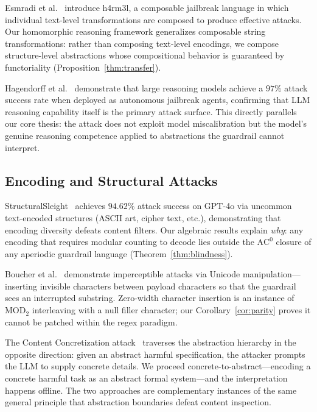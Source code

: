 \documentclass[letterpaper,twocolumn,10pt]{article}
\theoremstyle{definition}
\theoremstyle{remark}
\begin{document}
Esmradi et al.~\cite{esmradi2024h4rm3l} introduce h4rm3l, a composable jailbreak
language in which individual text-level transformations are composed to produce
effective attacks.
Our homomorphic reasoning framework generalizes composable string transformations:
rather than composing text-level encodings, we compose structure-level abstractions
whose compositional behavior is guaranteed by functoriality
(Proposition~\ref{thm:transfer}).

Hagendorff et al.~\cite{reasoning_jailbreak2026} demonstrate that large reasoning models
achieve a $97\%$ attack success rate when deployed as autonomous jailbreak agents,
confirming that LLM reasoning capability itself is the primary attack surface.
This directly parallels our core thesis: the attack does not exploit model
miscalibration but the model's genuine reasoning competence applied to
abstractions the guardrail cannot interpret.

\subsection{Encoding and Structural Attacks}\label{sec:related-encoding}

StructuralSleight~\cite{structuralsleight2024} achieves $94.62\%$ attack success
on GPT-4o via uncommon text-encoded structures (ASCII art, cipher text, etc.),
demonstrating that encoding diversity defeats content filters.
Our algebraic results explain \emph{why}: any encoding that requires modular
counting to decode lies outside the $\mathrm{AC}^0$ closure of any aperiodic
guardrail language (Theorem~\ref{thm:blindness}).

Boucher et al.~\cite{boucher2021badchars} demonstrate imperceptible attacks via
Unicode manipulation---inserting invisible characters between payload characters
so that the guardrail sees an interrupted substring.
Zero-width character insertion is an instance of $\mathrm{MOD}_2$ interleaving with
a null filler character; our Corollary~\ref{cor:parity} proves it cannot be patched
within the regex paradigm.

The Content Concretization attack~\cite{concretization2025} traverses the
abstraction hierarchy in the opposite direction: given an abstract harmful
specification, the attacker prompts the LLM to supply concrete details.
We proceed concrete-to-abstract---encoding a concrete harmful task as an abstract
formal system---and the interpretation happens offline.
The two approaches are complementary instances of the same general principle that
abstraction boundaries defeat content inspection.
\end{document}
